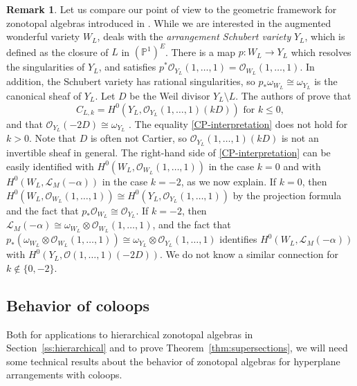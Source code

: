 \documentclass{amsart}
\theoremstyle{definition}
\newtheorem{remark}[theorem]{Remark}
\begin{document}
\begin{remark}\label{rem:CP25} Let us compare our point of view to the 
    geometric framework for zonotopal algebras introduced in 
    \cite{GeoZonotopeII}. While we are interested in the augmented 
    wonderful variety $W_L$, \cite{GeoZonotopeII} deals with the 
    \emph{arrangement Schubert variety} $Y_L$, which is defined as the closure of $L$ in $(\mathbb{P}^1)^E$. There is a map $p \colon W_L \to Y_L$ which 
    resolves the singularities of $Y_L$, and satisfies $p^* 
    \mathcal{O}_{Y_L}(1, \ldots, 1) = \mathcal{O}_{W_L}(1, \ldots, 1)$. 
    In addition, the Schubert variety has rational singularities, so 
    $p_* \omega_{W_L} \cong \omega_{Y_L}$ is the canonical sheaf of $Y_L$. Let $D$ be the Weil divisor $Y_L \setminus L$. 
    The authors of 
    \cite{GeoZonotopeII} prove that 
    \begin{equation}\label{CP-interpretation}
        C_{L, k} = H^0(Y_L, \mathcal{O}_{Y_L}(1, \ldots, 1)(kD)) \text{ for }k \le 0,
    \end{equation}
    and that $\mathcal{O}_{Y_L}(-2D) \cong \omega_{Y_L}$ 
    \cite[Theorem 1.14, Proposition 4.4]{GeoZonotopeII}. The equality \eqref{CP-interpretation} does not hold for $k > 0$. Note that $D$ 
    is often not Cartier, so $\mathcal{O}_{Y_L}(1, \ldots, 1)(kD)$ is not an invertible sheaf in general. The right-hand side of 
    \eqref{CP-interpretation} can be easily identified 
    with $H^0(W_L, \mathcal{O}_{W_L}(1, \ldots, 1))$ in the case $k=0$ and with $H^0(W_L, \mathcal{L}_M(-\alpha))$ in the case $k=-2$, as 
    we now explain. If $k=0$, then $H^0(W_L, \mathcal{O}_{W_L}(1, \ldots, 1)) 
    \cong H^0(Y_L, \mathcal{O}_{Y_L}(1, \ldots, 1))$ by the projection 
    formula and the fact that $p_*\mathcal{O}_{W_L} \cong 
    \mathcal{O}_{Y_L}$. If $k = -2$, then $\mathcal{L}_M(-\alpha) \cong \omega_{W_L} \otimes \mathcal{O}_{W_L}(1, \dotsc, 1)$, and the fact that $p_* (\omega_{W_L} \otimes \mathcal{O}_{W_L}(1, \dotsc, 1)) \cong \omega_{Y_L} \otimes \mathcal{O}_{Y_L}(1, \dotsc, 1)$ identifies $H^0(W_L, \mathcal{L}_M(-\alpha))$ with $H^0(Y_L, \mathcal{O}(1, \dotsc, 1)(-2D))$. We do not know a 
    similar connection for $k \not\in \{0,-2\}$. 
\end{remark}

\subsection{Behavior of coloops}

Both for applications to hierarchical zonotopal algebras in Section~\ref{ss:hierarchical} and to prove Theorem~\ref{thm:supersections}, we will need some technical results about the behavior of zonotopal algebras for hyperplane arrangements with coloops. 
\end{document}
